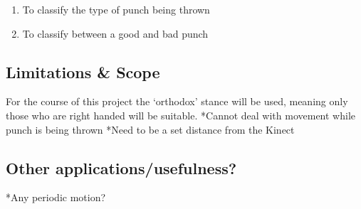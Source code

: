 \begin{enumerate}
  \item To classify the type of punch being thrown
  \item To classify between a good and bad punch
\end{enumerate}

\subsection{Limitations \& Scope}
\label{subsec:subsec01}
For the course of this project the `orthodox' stance will be used, meaning only those who are right handed will be suitable.
*Cannot deal with movement while punch is being thrown
*Need to be a set distance from the Kinect

\subsection{Other applications/usefulness?}
\label{subsec:subsec01}
*Any periodic motion?
